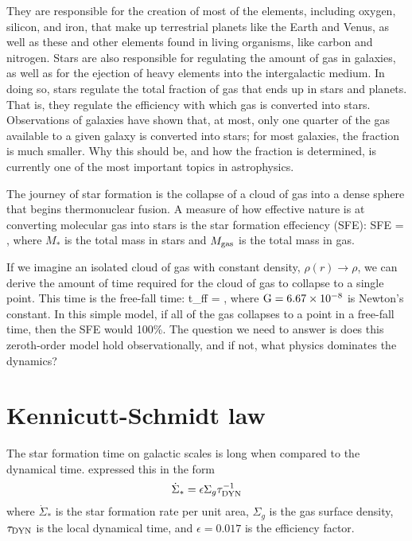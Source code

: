 \documentclass[../dissertation.tex]{subfiles}
\begin{document}
They are responsible for the creation of most of the elements, including  oxygen, silicon, and iron, that make up
terrestrial planets like the Earth and Venus, as well as these and other elements found in
living organisms, like carbon and nitrogen. 
Stars are also responsible for regulating the
amount of gas in galaxies, as well as for the ejection of heavy elements into the intergalactic
medium. 
In doing so, stars regulate the total fraction of gas that ends up in stars and planets. 
That is, they regulate the efficiency with which gas is converted into stars. 
Observations of galaxies have shown that, at most, only one quarter of the gas available to a given galaxy is
converted into stars; for most galaxies, the fraction is much smaller. 
Why this should be, and how the fraction is determined, is currently one of the most important topics in astrophysics.


The journey of star formation is the collapse of a cloud of gas into a dense sphere that begins thermonuclear fusion.
A measure of how effective nature is at converting molecular gas into stars is the star formation effeciency (SFE):
%
\be
{\rm SFE} = ,
\ee
%
where $M_*$ is the total mass in stars and $M_{\rm gas}$ is the total mass in gas.

If we imagine an isolated cloud of gas with constant density, $\rho(r) \rightarrow \rho$, we can derive the amount of time required for the cloud of gas to collapse to a single point.
This time is the free-fall time:
%
\be
t_{\rm ff} = ,
\ee
%
where $ {\rm G} = 6.67 \times 10^{-8} $ is Newton's constant.
In this simple model, if all of the gas collapses to a point in a free-fall time, then the SFE would 100\%.
The question we need to answer is does this zeroth-order model hold observationally, and if not, what physics dominates the dynamics?

\section{Kennicutt-Schmidt law}
The star formation time on galactic scales is long when compared to the dynamical time. 
\citet{1998ApJ...498..541K} expressed this in the form
%
\begin{equation}\label{eq:intro_KS_law}
\dot{\Sigma}_* = \epsilon\Sigma_g \tau_{\rm DYN}^{-1}
\end{equation}
%
where $\dot{\Sigma}_*$ is the star formation rate per unit area, $\Sigma_g$ is the 
gas surface density, $\tau_{\rm DYN}$ is the local dynamical time, and $\epsilon = 0.017$ 
is the efficiency factor.  
\end{document}
